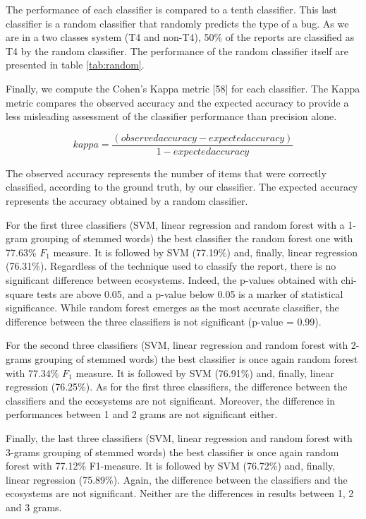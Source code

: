 \documentclass[12pt]{report}
\begin{document}
The performance of each classifier is compared to a tenth classifier.
This last classifier is a random classifier that randomly predicts the
type of a bug. As we are in a two classes system (T4 and non-T4), 50\%
of the reports are classified as T4 by the random classifier. The
performance of the random classifier itself are presented in table
\ref{tab:random}.

Finally, we compute the Cohen's Kappa metric {[}58{]} for each
classifier. The Kappa metric compares the observed accuracy and the
expected accuracy to provide a less misleading assessment of the
classifier performance than precision alone.

\begin{equation}
kappa = \frac{(observed accuracy - expected accuracy)}{1 - expected accuracy}
\end{equation}

The observed accuracy represents the number of items that were correctly
classified, according to the ground truth, by our classifier. The
expected accuracy represents the accuracy obtained by a random
classifier.



For the first three classifiers (SVM, linear regression and random
forest with a 1-gram grouping of stemmed words) the best classifier the
random forest one with 77.63\% \(F_1\) measure. It is followed by SVM
(77.19\%) and, finally, linear regression (76.31\%). Regardless of the
technique used to classify the report, there is no significant
difference between ecosystems. Indeed, the p-values obtained with
chi-square tests are above 0.05, and a p-value below 0.05 is a marker of
statistical significance. While random forest emerges as the most
accurate classifier, the difference between the three classifiers is not
significant (p-value = 0.99).



For the second three classifiers (SVM, linear regression and random
forest with 2-grams grouping of stemmed words) the best classifier is
once again random forest with 77.34\% \(F_1\) measure. It is followed by
SVM (76.91\%) and, finally, linear regression (76.25\%). As for the
first three classifiers, the difference between the classifiers and the
ecosystems are not significant. Moreover, the difference in performances
between 1 and 2 grams are not significant either.



Finally, the last three classifiers (SVM, linear regression and random
forest with 3-grams grouping of stemmed words) the best classifier is
once again random forest with 77.12\% F1-measure. It is followed by SVM
(76.72\%) and, finally, linear regression (75.89\%). Again, the
difference between the classifiers and the ecosystems are not
significant. Neither are the differences in results between 1, 2 and 3
grams.
\end{document}
